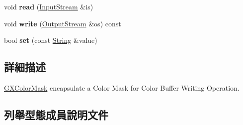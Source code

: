 \begin{DoxyCompactItemize}
\item 
void {\bfseries read} (\hyperlink{class_i_dream_sky_1_1_input_stream}{Input\+Stream} \&is)\hypertarget{class_i_dream_sky_1_1_g_x_color_mask_ab157e45326d3fab9cb53cc9cdb5384dc}{}\label{class_i_dream_sky_1_1_g_x_color_mask_ab157e45326d3fab9cb53cc9cdb5384dc}

\item 
void {\bfseries write} (\hyperlink{class_i_dream_sky_1_1_output_stream}{Output\+Stream} \&os) const \hypertarget{class_i_dream_sky_1_1_g_x_color_mask_a8aaa09b547efbc4c15a8b96dba41df35}{}\label{class_i_dream_sky_1_1_g_x_color_mask_a8aaa09b547efbc4c15a8b96dba41df35}

\item 
bool {\bfseries set} (const \hyperlink{class_i_dream_sky_1_1_string}{String} \&value)\hypertarget{class_i_dream_sky_1_1_g_x_color_mask_ada9816f8069f6e2f12ca193882a63cd8}{}\label{class_i_dream_sky_1_1_g_x_color_mask_ada9816f8069f6e2f12ca193882a63cd8}

\end{DoxyCompactItemize}


\subsection{詳細描述}
\hyperlink{class_i_dream_sky_1_1_g_x_color_mask}{G\+X\+Color\+Mask} encapsulate a Color Mask for Color Buffer Writing Operation. 

\subsection{列舉型態成員說明文件}
